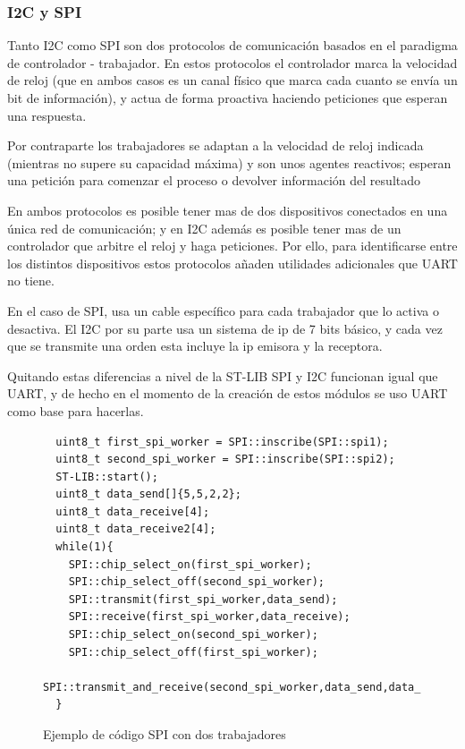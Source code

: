 \documentclass{report}
\begin{document}
\subsubsection{I2C y SPI}
Tanto I2C como SPI son dos protocolos de comunicación basados en el paradigma de controlador - trabajador. En estos protocolos el controlador marca la velocidad de reloj (que en ambos casos es un canal físico que marca cada cuanto se envía un bit de información), y actua de forma proactiva haciendo peticiones que esperan una respuesta. \par
Por contraparte los trabajadores se adaptan a la velocidad de reloj indicada (mientras no supere su capacidad máxima) y son unos agentes reactivos; esperan una petición para comenzar el proceso o devolver información del resultado \par \vspace{0.3cm}
En ambos protocolos es posible tener mas de dos dispositivos conectados en una única red de comunicación; y en I2C además es posible tener mas de un controlador que arbitre el reloj y haga peticiones. Por ello, para identificarse entre los distintos dispositivos estos protocolos añaden utilidades adicionales que UART no tiene. \par
En el caso de SPI, usa un cable específico para cada trabajador que lo activa o desactiva. El I2C por su parte usa un sistema de ip de 7 bits básico, y cada vez que se transmite una orden esta incluye la ip emisora y la receptora. \par \vspace{0.3cm}
Quitando estas diferencias a nivel de la ST-LIB SPI y I2C funcionan igual que UART, y de hecho en el momento de la creación de estos módulos se uso UART como base para hacerlas. \par
\begin{figure}[h]
\begin{lstlisting}
  uint8_t first_spi_worker = SPI::inscribe(SPI::spi1);
  uint8_t second_spi_worker = SPI::inscribe(SPI::spi2);
  ST-LIB::start();
  uint8_t data_send[]{5,5,2,2};
  uint8_t data_receive[4];
  uint8_t data_receive2[4];
  while(1){
    SPI::chip_select_on(first_spi_worker);
    SPI::chip_select_off(second_spi_worker);
    SPI::transmit(first_spi_worker,data_send);
    SPI::receive(first_spi_worker,data_receive);
    SPI::chip_select_on(second_spi_worker);
    SPI::chip_select_off(first_spi_worker);
    SPI::transmit_and_receive(second_spi_worker,data_send,data_receive2);
  }
\end{lstlisting}
\caption{Ejemplo de código SPI con dos trabajadores}
  \label{SPIcode}
\end{figure}
\end{document}
